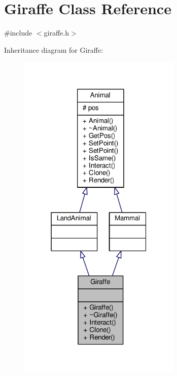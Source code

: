 \hypertarget{classGiraffe}{}\section{Giraffe Class Reference}
\label{classGiraffe}


{\ttfamily \#include $<$giraffe.\+h$>$}



Inheritance diagram for Giraffe\+:
\nopagebreak
\begin{figure}[H]
\begin{center}
\leavevmode
\includegraphics[width=220pt]{classGiraffe__inherit__graph}
\end{center}
\end{figure}


